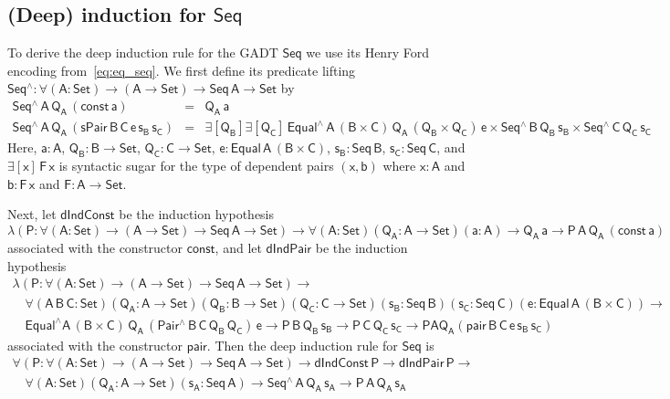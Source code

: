 \documentclass[9pt]{entcs}
\begin{document}
\subsection{(Deep) induction for $\mathsf{Seq}$}\label{sec:ind-seq}

To derive the deep induction rule for the GADT $\mathsf{Seq}$ we use
its Henry Ford encoding from~\eqref{eq:eq_seq}.  We first define its
predicate lifting $\mathsf{Seq^\wedge : \forall (A : Set) \to (A \to
  Set) \to Seq\,A \to Set}$ by
\[\begin{array}{lll}
\mathsf{Seq^{\wedge}\,A\,Q_A\,(const\,a)} & = & \mathsf{Q_A\,a}\\
\mathsf{Seq^{\wedge}\,A\,Q_A\,(sPair\,B\,C\,e\,s_B\,s_C)}
&=&\mathsf{\exists [Q_B] \exists [Q_C]\, Equal^{\wedge}\,A\, (B
  \times C)\, Q_A\, (Q_B \times Q_C) \, e \times
  Seq^{\wedge}\,B\,Q_B\,s_B \times Seq^{\wedge}\,C\,Q_C\,s_C}
\end{array}\]
Here, $\mathsf{a : A}$, $\mathsf{Q_B : B \to Set}$, $\mathsf{Q_C : C
  \to Set}$, $\mathsf{e : Equal\,A\,(B \times C)}$, $\mathsf{s_B :
  Seq\,B}$, $\mathsf{s_C : Seq\,C}$, and $\mathsf{\exists [x]\, F
  \,x}$ is syntactic sugar for the type of dependent pairs
$\mathsf{(x,b)}$ where $\mathsf{x : A}$ and $\mathsf{b : F\, x}$ and
$\mathsf{F : A \to Set}$.

Next, let $\mathsf{dIndConst}$ be the induction hypothesis
\[\mathsf{
\lambda (P : \forall (A : Set) \to (A \to Set) \to Seq\,A \to Set) \to
\forall (A : Set) (Q_A : A \to Set) (a : A) \to Q_A\,a \to
P\,A\,Q_A\,(const\,a)}\] associated with the constructor
$\mathsf{const}$, and let $\mathsf{dIndPair}$ be the induction
hypothesis
\[\begin{array}{l}
\mathsf{\lambda (P : \forall (A : Set) \to (A \to Set) \to Seq\,A \to
  Set)} \to \\ 
\quad \mathsf{\forall (A\,B\,C : Set) (Q_A : A \to Set) (Q_B : B
  \to Set) (Q_C : C \to Set)(s_B : Seq\,B) (s_C : Seq\,C) (e :
  Equal\,A\,(B \times C)) \to} \\ 
\quad \mathsf{Equal^{\wedge} A\, (B \times C)\, Q_A\,
  (Pair^{\wedge}\,B\,C\,Q_B\,Q_C)\, e \to P\,B\,Q_B\,s_B \to
  P\,C\,Q_C\,s_C \to P A Q_A ( pair\,B\,C\,e\,s_B\,s_C )}
\end{array}\]
associated with the constructor $\mathsf{pair}$. Then the deep
induction rule for $\mathsf{Seq}$ is
\begin{equation}\label{eq:ind-seq}
\begin{array}{l}
\mathsf{\forall (P : \forall (A : Set) \to (A \to Set) \to Seq\,A \to
  Set)} \mathsf{\to dIndConst\,P \to dIndPair\,P \to} \\ \quad
\mathsf{\forall (A : Set)(Q_A : A \to Set)(s_A : Seq\,A) \to
  Seq^{\wedge}\,A\,Q_A\,s_A \to P\,A\,Q_A\,s_A}
\end{array}
\end{equation}
\end{document}
